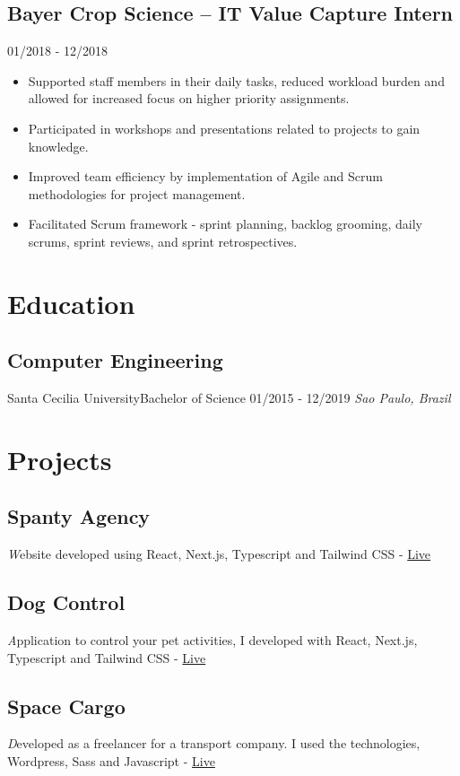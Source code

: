\documentclass[11pt, a4paper]{article}
\begin{document}
\subsection*{Bayer Crop Science -- IT Value Capture Intern}
\hfill 01/2018 - 12/2018
\begin{itemize}
    \item Supported staff members in their daily tasks, reduced workload burden and allowed for increased focus on higher priority assignments.
    \item Participated in workshops and presentations related to projects to gain knowledge.  
    \item Improved team efficiency by implementation of Agile and Scrum methodologies for project management.
    \item Facilitated Scrum framework - sprint planning, backlog grooming, daily scrums, sprint reviews, and sprint retrospectives.
\end{itemize}

\section*{Education}
\subsection*{Computer Engineering}
Santa Cecilia University\hfill Bachelor of Science \hfill 01/2015 - 12/2019
\textit{Sao Paulo, Brazil}

\section*{Projects}
\subsection*{Spanty Agency}
\textit Website developed using React, Next.js, Typescript and Tailwind CSS - \href{https://agency-spanty.vercel.app/}{Live}

\subsection*{Dog Control}
\textit Application to control your pet activities, I developed with React, Next.js, Typescript and Tailwind CSS - \href{https://table-application.vercel.app/}{Live}

\subsection*{Space Cargo}
\textit Developed as a freelancer for a transport company. I used the technologies, Wordpress, Sass and Javascript - \href{https://spacecargo.com.br/}{Live}
\end{document}
